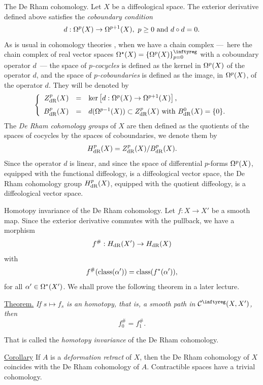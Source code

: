 \begin{Article}{The De Rham cohomology.}{}
  \label{The-De-Rham-cohomology}
  Let $X$ be a diffeological space.
  The exterior derivative defined above satisfies the \emph{coboundary condition}
  $$%
    d: \DForms^p(X) \to \DForms^{p+1}(X),
    \ p \geq 0
    \SpacedText{and}
    d \circ d = 0.
  $$%
  As is usual in cohomology theories \cite{McL75},
  when we have a chain complex
  ---~here the chain complex of real vector spaces $\DForms^\star(X) = \{\DForms^p(X)\}_{p=0}^\infty$ with a coboundary operator $d$~---
  the space of \emph{$p$-cocycles} is defined as the kernel in $\Omega^p(X)$ of the operator $d$,
  and the space of \emph{$p$-coboundaries} is defined as the image,
  in $\Omega^p(X)$,
  of the operator $d$.
  They will be denoted by
   \vspace{.5ex}
   $$%
    \left\{
    \begin{array}{rcl}
    \ZDR^p(X) & = &\ker \left[d: \DForms^p(X) \to \DForms^{p+1}(X)\right], \\[1.5ex]
    \BDR^p(X) & = & d (\DForms^{p-1}(X))\subset \ZDR^p(X)
    \SpacedText{with}
    \BDR^0(X) = \{0\}.
    \end{array}
    \right.
  $$%
  The \emph{De Rham cohomology groups} of $X$ are then defined as the quotients of the spaces of cocycles by the spaces of coboundaries,
  we denote them by
  $$%
    \HDR^p(X) = \ZDR^p(X)/\BDR^p(X).
  $$%
  Since the operator $d$ is linear,
  and since the space of differential $p$-forms $\Omega^p(X)$,
  equipped with the functional diffeology,
  is a diffeological vector space,
  the De Rham cohomology group $H_\mathrm{dR}^p(X)$,
  equipped with the quotient diffeology,
  is a diffeological vector space.
\end{Article}

\begin{Article}{Homotopy invariance of the De Rham cohomology.}{}
  Let $f : X \to X'$ be a smooth map.
  Since the exterior derivative commutes with the pullback,
  we have a morphism
  $$%
    f^\# : \HDR(X') \to \HDR(X)
  $$%
  with
  $$%
    f^\#(\Class(\alpha')) = \Class(f^*(\alpha')),
  $$%
  for all $\alpha' \in \Omega^*(X')$.
  We shall prove the following theorem in a later lecture.

  \uline{Theorem.} {\itshape If $s \mapsto f_s$ is an homotopy,
  that is,
  a smooth path in $\Cinfty(X,X')$,
  then
  $$%
    f_0^\# = f_1^\#.$$%
  }

  That is called the \emph{homotopy invariance} of the De Rham cohomology.

  \uline{Corollary} If $A$ is a \emph{deformation retract} of $X$,
  then the De Rham cohomology of $X$ coincides with the De Rham cohomology of $A$.
  Contractible spaces have a trivial cohomology.
\end{Article}

